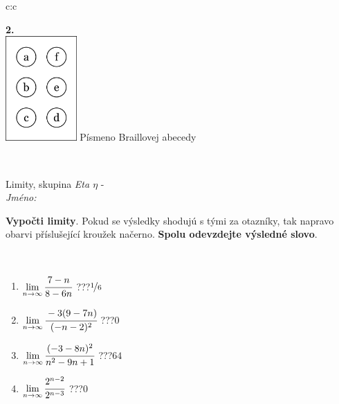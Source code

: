 \documentclass[10pt]{report}
\begin{document}
\begin{tabular}{c:c}
\begin{minipage}[c][104.5mm][t]{0.5\linewidth}
\begin{center}
\begin{minipage}{0.20\linewidth}
\begin{center}
{\Huge\bfseries 2.} \\[2mm]
\includegraphics[height=40mm]{../images/braille.png}
{\small Písmeno Braillovej abecedy}
\end{center}
\end{minipage}
\end{center}
\end{minipage}
\\ \hdashline
\begin{minipage}[c][104.5mm][t]{0.5\linewidth}
\begin{center}
\vspace{7mm}
{\huge Limity, skupina \textit{Eta $\eta$} -}\\[5mm]
\textit{Jméno:}\phantom{xxxxxxxxxxxxxxxxxxxxxxxxxxxxxxxxxxxxxxxxxxxxxxxxxxxxxxxxxxxxxxxxx}\\[5mm]
\begin{minipage}{0.95\linewidth}
\begin{center}
\textbf{Vypočti limity}. Pokud se výsledky shodujú s tými za otazníky, tak napravo\\obarvi příslušející kroužek načerno. \textbf{Spolu odevzdejte výsledné slovo}.
\end{center}
\end{minipage}
\\[1mm]
\begin{minipage}{0.79\linewidth}
\begin{center}
\begin{varwidth}{\linewidth}
\begin{enumerate}
\normalsize
\item $\lim\limits_{n\to\infty}\cfrac{7-n}{8-6n}$\quad \dotfill\; ???\;\dotfill \quad $\nicefrac{1}{6}$
\item $\lim\limits_{n\to\infty}\cfrac{-3(9-7n)}{(-n-2)^2}$\quad \dotfill\; ???\;\dotfill \quad $0$
\item $\lim\limits_{n\to\infty}\cfrac{(-3-8n)^2}{n^2-9n+1}$\quad \dotfill\; ???\;\dotfill \quad $64$
\item $\lim\limits_{n\to\infty}\cfrac{2^{n-2}}{2^{n-3}}$\quad \dotfill\; ???\;\dotfill \quad $0$

\end{enumerate}
\end{varwidth}
\end{center}
\end{minipage}
\end{center}
\end{minipage}
\end{tabular}
\end{document}

